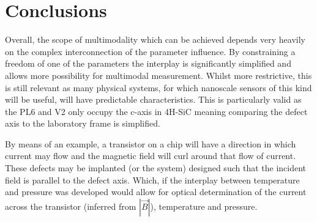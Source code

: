 \chapter{Conclusions}\label{ch:conclusions}

Overall, the scope of multimodality which can be achieved depends very heavily on the complex interconnection of the parameter influence. By constraining a freedom of one of the parameters the interplay is significantly simplified and allows more possibility for multimodal measurement. Whilst more restrictive, this is still relevant as many physical systems, for which nanoscale sensors of this kind will be useful, will have predictable characteristics. This is particularly valid as the PL6 and V2 only occupy the c-axis in 4H-SiC meaning comparing the defect axis to the laboratory frame is simplified. 

By means of an example, a transistor on a chip will have a direction in which current may flow and the magnetic field will curl around that flow of current. These defects may be implanted (or the system) designed such that the incident field is parallel to the defect axis. Which, if the interplay between temperature and pressure was developed would allow for optical determination of the current across the transistor (inferred from $|\vec{B}|$), temperature and pressure. 


